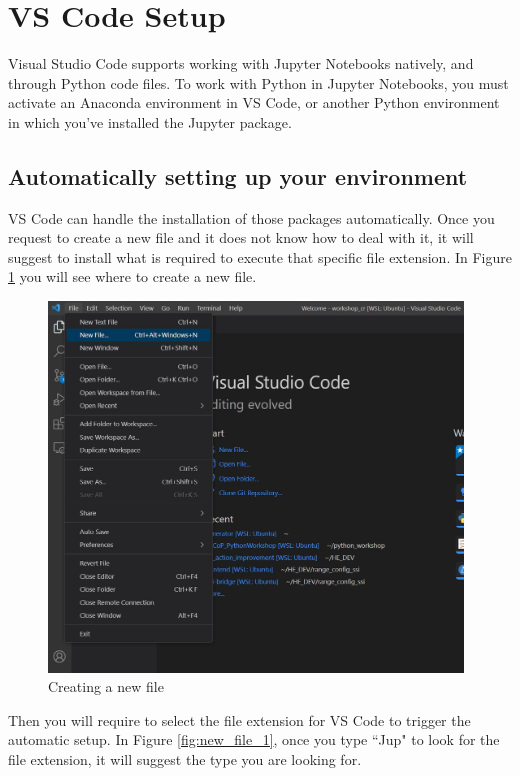 \documentclass{assignment}
\begin{document}
\newpage

\section{VS Code Setup}
\label{sec:vs_code}
% 

Visual Studio Code supports working with Jupyter Notebooks natively, and through Python code files. To work with Python in Jupyter Notebooks, you must activate an Anaconda environment in VS Code, or another Python environment in which you've installed the Jupyter package. 

\subsection{Automatically setting up your environment}

VS Code can handle the installation of those packages automatically. Once you request to create a new file and it does not know how to deal with it, it will suggest to install what is required to execute that specific file extension. In Figure \ref{fig:new_file_0} you will see where to create a new file.

\begin{figure}[h]
 \centering 
    \includegraphics[width=11cm]{assets/vs_code_new_file.JPG}
    \caption{Creating a new file}
    \label{fig:new_file_0}
\end{figure}

\newpage

Then you will require to select the file extension for VS Code to trigger the automatic setup. In Figure \ref{fig:new_file_1}, once you type ``Jup" to look for the file extension, it will suggest the type you are looking for.
\end{document}
